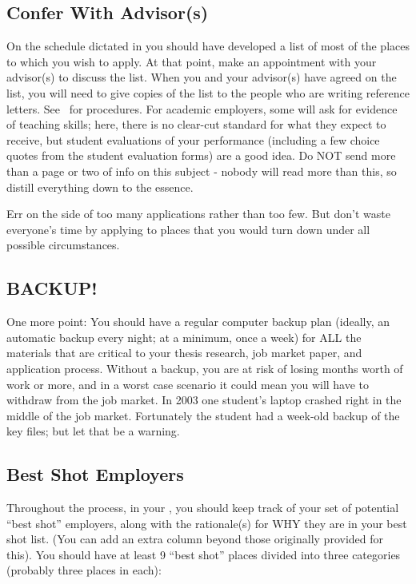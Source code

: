 \documentclass{\classes/econtex}
\begin{document}
\hypertarget{confer-with-advisors}{}
\subsection{Confer With Advisor(s)}
On the schedule dictated in {\timet}  you should have developed a list of most of the places to which you wish to apply.  At that point, make an appointment with your advisor(s) to discuss the list.  When you and your advisor(s) have agreed on the list, you will need to give copies of the list to the people who are writing reference letters.  See \recLet~for procedures. For academic employers, some will ask for evidence of teaching skills; here, there is no clear-cut standard for what they expect to receive, but student evaluations of your performance (including a few choice quotes from the student evaluation forms) are a good idea.  Do NOT send more than a page or two of info on this subject - nobody will read more than this, so distill everything down to the essence.

Err on the side of too many applications rather than too few.  But
don't waste everyone's time by applying to places that you would turn
down under all possible circumstances.

\hypertarget{backup}{}
\subsection{BACKUP!}
One more point: You should have a regular computer backup plan
(ideally, an automatic backup every night; at a minimum, once a week)
for ALL the materials that are critical to your thesis research,
job market paper, and application process.  Without a backup, you are
at risk of losing months worth of work or more, and in a worst case
scenario it could mean you will have to withdraw from the job market.
In 2003 one student's laptop crashed right in the middle of the job
market.  Fortunately the student had a week-old backup of the key
files; but let that be a warning.

\subsection*{Best Shot Employers}
\hypertarget{best-shot}{}
Throughout the process, in your {\EMW}, you should keep track of your set of potential ``best shot'' employers, along with the rationale(s) for WHY they are in your best shot list.  (You can add an extra column beyond those originally provided for this). You should have at least 9 ``best shot'' places divided into three categories (probably three places in each):
\end{document}
